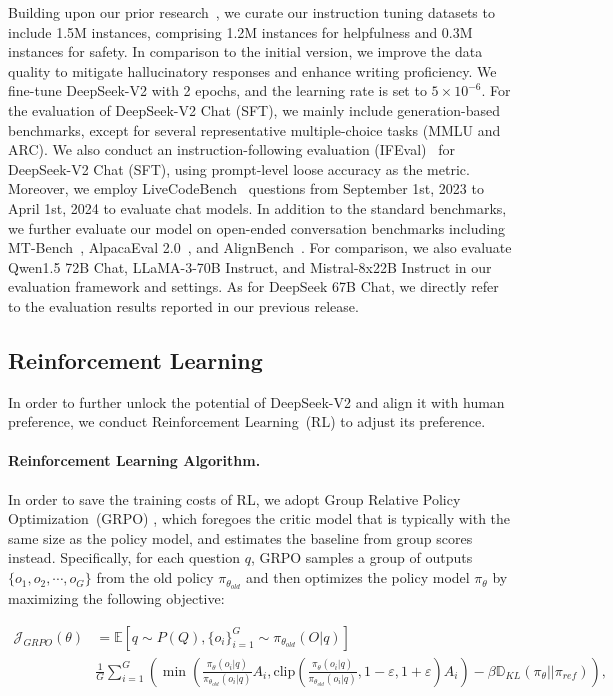 Building upon our prior research~\citep{deepseek1}, we curate our instruction tuning datasets to include 1.5M instances, comprising 1.2M instances for helpfulness and 0.3M instances for safety. In comparison to the initial version, we improve the data quality to mitigate hallucinatory responses and enhance writing proficiency. We fine-tune DeepSeek-V2 with 2 epochs, and the learning rate is set to $5 \times 10^{-6}$. For the evaluation of DeepSeek-V2 Chat (SFT), we mainly include generation-based benchmarks, except for several representative multiple-choice tasks (MMLU and ARC). We also conduct an instruction-following evaluation (IFEval)~\citep{IFeval} for DeepSeek-V2 Chat (SFT), using prompt-level loose accuracy as the metric. Moreover, we employ LiveCodeBench~\citep{jain2024livecodebench} questions from September 1st, 2023 to April 1st, 2024 to evaluate chat models. In addition to the standard benchmarks, we further evaluate our model on open-ended conversation benchmarks including MT-Bench~\citep{mtbench}, AlpacaEval 2.0~\citep{alpaca2.0}, and AlignBench~\citep{align_bench}. For comparison, we also evaluate Qwen1.5 72B Chat, LLaMA-3-70B Instruct, and Mistral-8x22B Instruct in our evaluation framework and settings. As for DeepSeek 67B Chat, we directly refer to the evaluation results reported in our previous release. 

\subsection{Reinforcement Learning}

In order to further unlock the potential of DeepSeek-V2 and align it with human preference, we conduct Reinforcement Learning~(RL) to adjust its preference. 

\paragraph{Reinforcement Learning Algorithm.} In order to save the training costs of RL, we adopt Group Relative Policy Optimization~(GRPO) \citep{deepseekmath}, which foregoes the critic model that is typically with the same size as the policy model, and estimates the baseline from group scores instead. Specifically, for each question $q$, GRPO samples a group of outputs $\{o_1, o_2, \cdots, o_G\}$ from the old policy $\pi_{\theta_{old}}$ and then optimizes the policy model $\pi_{\theta}$ by maximizing the following objective:

\begin{equation}
\begin{split}
    \mathcal{J}_{GRPO}(\theta) &= \mathbb{E}{[q \sim P(Q), \{o_i\}_{i=1}^G \sim \pi_{\theta_{old}}(O|q)]}  \\
    & \frac{1}{G}\sum_{i=1}^G \left( \min \left( \frac{\pi_\theta(o_i |q)}{\pi_{\theta_{old}}(o_i |q)} A_i, \text{clip} \left( \frac{\pi_\theta(o_i |q)}{\pi_{\theta_{old}}(o_i |q)}, 1 - \varepsilon, 1 + \varepsilon \right)  A_i \right) - \beta \mathbb{D}_{KL}\left(\pi_{\theta} || \pi_{ref}\right)\right) ,
\end{split}
\label{eq:GRPO-obj}
\end{equation}

